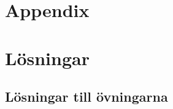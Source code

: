 \documentclass[a4paper]{compendium}
\newif\ifPreSolution  %
\let\QUESTBEGIN\ifPreSolution  %
\let\SOLUTION\else  %
\let\QUESTEND\fi    %
\begin{document}
%




\part{Appendix}
\appendix








\part{Lösningar}

\setcounter{chapter}{11} %
\renewcommand\thechapter{\Alph{chapter}}
\chapter{Lösningar till övningarna}\label{chapter:solutions}

\PreSolutionfalse

\let\QUESTBEGIN\ifPreSolution  %
\let\SOLUTION\else  %
\let\QUESTEND\fi    %










%  
%  
%
%
%
%
%
%
\end{document}

